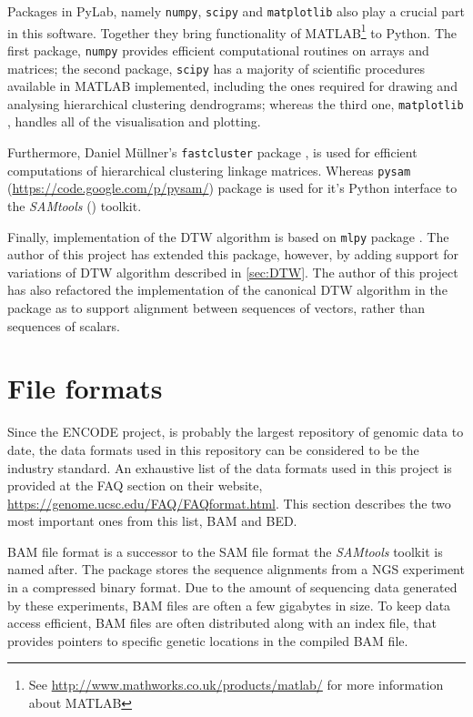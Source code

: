 \documentclass[parskip]{cs4rep}
\newcommand{\pythonpackage}[1]{{\tt #1}}
\begin{document}
Packages in PyLab, namely \pythonpackage{numpy}, \pythonpackage{scipy} and \pythonpackage{matplotlib} also play a crucial part in this software. Together they bring functionality of MATLAB\footnote{See \url{http://www.mathworks.co.uk/products/matlab/} for more information about MATLAB} to Python. The first package, \pythonpackage{numpy} provides efficient computational routines on arrays and matrices; the second package, \pythonpackage{scipy} has a majority of scientific procedures available in MATLAB implemented, including the ones required for drawing and analysing hierarchical clustering dendrograms; whereas the third one, \pythonpackage{matplotlib} \cite{Hunter:2007ux}, handles all of the visualisation and plotting. 

Furthermore, Daniel M\"ullner's \pythonpackage{fastcluster} package \cite{Mullner:2011wb}, is used for efficient computations
of hierarchical clustering linkage matrices. Whereas \pythonpackage{pysam} (\url{https://code.google.com/p/pysam/}) package is used for it's Python interface to the \emph{SAMtools} (\cite{Li:2009ka}) toolkit.

Finally, implementation of the DTW algorithm is based on \pythonpackage{mlpy} package \cite{Albanese:2012vf}. The author of this project has extended this package, however, by adding support for variations of DTW algorithm described in \autoref{sec:DTW}. The author of this project has also refactored the implementation of the canonical DTW algorithm in the package as to support alignment between sequences of vectors, rather than sequences of scalars.

\section{File formats}
Since the ENCODE project, \cite{Rosenbloom:2011gw} is probably the largest repository of genomic data to date, the data formats used in this repository can be considered to be the industry standard. An exhaustive list of the data formats used in this project is provided at the FAQ section on their website, \url{https://genome.ucsc.edu/FAQ/FAQformat.html}. This section describes the two most important ones from this list, BAM and BED.

BAM file format is a successor to the SAM file format the \emph{SAMtools} toolkit is named after. The package stores the sequence alignments from a NGS experiment in a compressed binary format. Due to the amount of sequencing data generated by these experiments, BAM files are often a few gigabytes in size. 
To keep data access efficient, BAM files are often distributed along with an index file, that provides pointers to specific genetic locations in the compiled BAM file.
\end{document}
